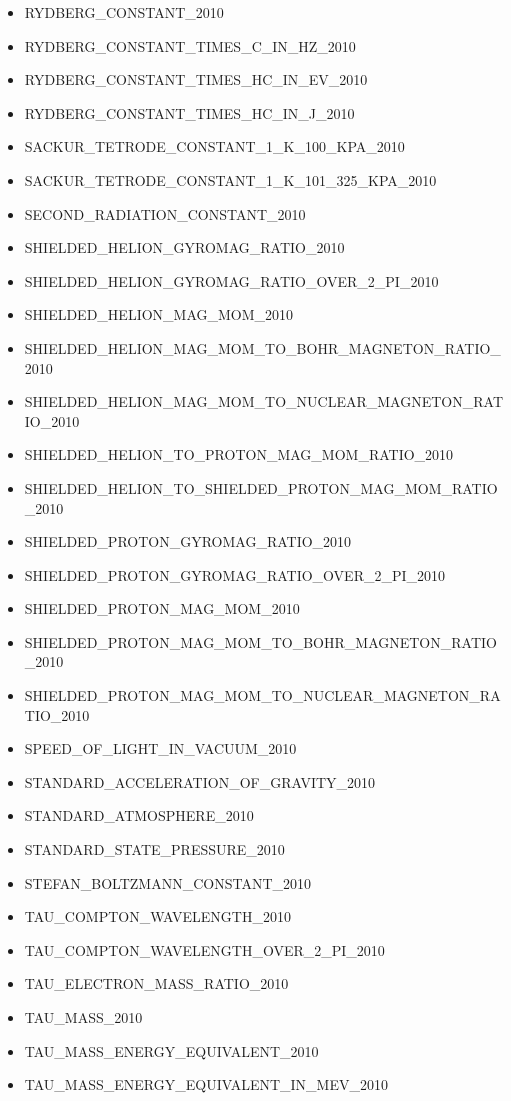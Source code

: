 \begin{itemize}
\item RYDBERG\_CONSTANT\_2010
\item RYDBERG\_CONSTANT\_TIMES\_C\_IN\_HZ\_2010
\item RYDBERG\_CONSTANT\_TIMES\_HC\_IN\_EV\_2010
\item RYDBERG\_CONSTANT\_TIMES\_HC\_IN\_J\_2010
\item SACKUR\_TETRODE\_CONSTANT\_1\_K\_100\_KPA\_2010
\item SACKUR\_TETRODE\_CONSTANT\_1\_K\_101\_325\_KPA\_2010
\item SECOND\_RADIATION\_CONSTANT\_2010
\item SHIELDED\_HELION\_GYROMAG\_RATIO\_2010
\item SHIELDED\_HELION\_GYROMAG\_RATIO\_OVER\_2\_PI\_2010
\item SHIELDED\_HELION\_MAG\_MOM\_2010
\item SHIELDED\_HELION\_MAG\_MOM\_TO\_BOHR\_MAGNETON\_RATIO\_2010
\item SHIELDED\_HELION\_MAG\_MOM\_TO\_NUCLEAR\_MAGNETON\_RATIO\_2010
\item SHIELDED\_HELION\_TO\_PROTON\_MAG\_MOM\_RATIO\_2010
\item SHIELDED\_HELION\_TO\_SHIELDED\_PROTON\_MAG\_MOM\_RATIO\_2010
\item SHIELDED\_PROTON\_GYROMAG\_RATIO\_2010
\item SHIELDED\_PROTON\_GYROMAG\_RATIO\_OVER\_2\_PI\_2010
\item SHIELDED\_PROTON\_MAG\_MOM\_2010
\item SHIELDED\_PROTON\_MAG\_MOM\_TO\_BOHR\_MAGNETON\_RATIO\_2010
\item SHIELDED\_PROTON\_MAG\_MOM\_TO\_NUCLEAR\_MAGNETON\_RATIO\_2010
\item SPEED\_OF\_LIGHT\_IN\_VACUUM\_2010
\item STANDARD\_ACCELERATION\_OF\_GRAVITY\_2010
\item STANDARD\_ATMOSPHERE\_2010
\item STANDARD\_STATE\_PRESSURE\_2010
\item STEFAN\_BOLTZMANN\_CONSTANT\_2010
\item TAU\_COMPTON\_WAVELENGTH\_2010
\item TAU\_COMPTON\_WAVELENGTH\_OVER\_2\_PI\_2010
\item TAU\_ELECTRON\_MASS\_RATIO\_2010
\item TAU\_MASS\_2010
\item TAU\_MASS\_ENERGY\_EQUIVALENT\_2010
\item TAU\_MASS\_ENERGY\_EQUIVALENT\_IN\_MEV\_2010

\end{itemize}
